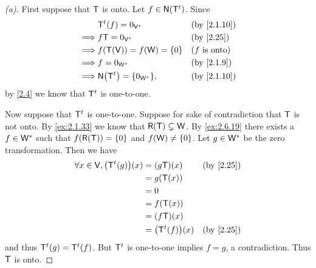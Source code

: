 \begin{proof}[(a)]
	First suppose that \(\mathsf{T}\) is onto.
	Let \(f \in \ns{\tp{\T}}\).
	Since
	\begin{align*}
		         & \tp{\T}(f) = 0_{\V^*}          &  & \by{2.1.10}            \\
		\implies & f \T = 0_{\V^*}                &  & \by{2.25}              \\
		\implies & f(\T(\V)) = f(\W) = \set{0}    &  & \text{(\(f\) is onto)} \\
		\implies & f = 0_{\W^*}                   &  & \by{2.1.9}             \\
		\implies & \ns{\tp{\T}} = \set{0_{\W^*}}, &  & \by{2.1.10}
	\end{align*}
	by \cref{2.4} we know that \({\mathsf{T}}^{t}\) is one-to-one.

	Now suppose that \({\mathsf{T}}^{t}\) is one-to-one.
	Suppose for sake of contradiction that \(\mathsf{T}\) is not onto.
	By \cref{ex:2.1.33} we know that \(\rg{\T} \subsetneq \W\).
	By \cref{ex:2.6.19} there exists a \(f \in \mathsf{W}^*\) such that \(f(\rg{\T}) = \set{0}\) and \(f(\mathsf{W}) \neq \left\lbrace0\right\rbrace\).
	Let \(g \in \mathsf{W}^*\) be the zero transformation.
	Then we have
	\begin{align*}
		\forall x \in \V, \pa{\tp{\T}(g)}(x) & = (g \T)(x)          &  & \by{2.25} \\
		                                     & = g(\T(x))                          \\
		                                     & = 0                                 \\
		                                     & = f(\T(x))                          \\
		                                     & = (f \T)(x)                         \\
		                                     & = \pa{\tp{\T}(f)}(x) &  & \by{2.25}
	\end{align*}
	and thus \({\mathsf{T}}^{t}(g) = {\mathsf{T}}^{t}(f)\).
	But \({\mathsf{T}}^{t}\) is one-to-one implies \(f = g\), a contradiction.
	Thus \(\mathsf{T}\) is onto.
\end{proof}

